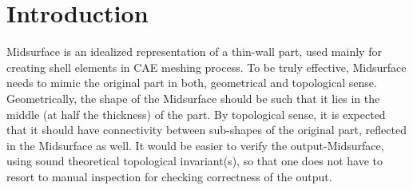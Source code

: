 \section{Introduction}
Midsurface is an idealized representation of a thin-wall part, used mainly for creating shell elements in CAE meshing process. To be truly effective, Midsurface needs to mimic the original part in both, geometrical and topological sense. Geometrically, the shape of the Midsurface should be such that it lies in the middle (at half the thickness) of the part. By topological sense, it is expected that it should have connectivity between sub-shapes of the original part, reflected in the Midsurface as well. It would be easier to verify the output-Midsurface, using sound theoretical topological invariant(s), so that one does not have to resort to manual inspection for checking correctness of the output. 

